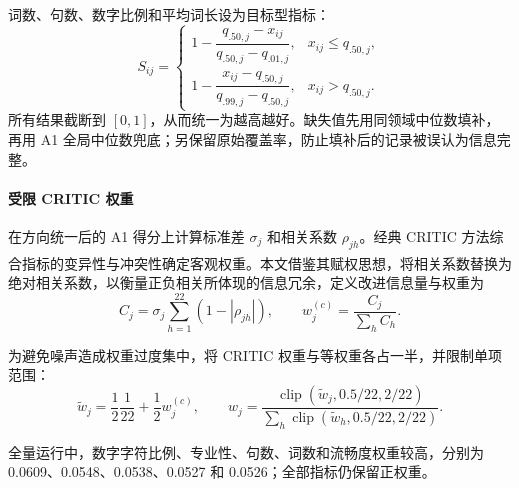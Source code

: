 \documentclass[bwprint]{gmcmthesis}
\numberwithin{equation}{section}
\numberwithin{figure}{section}
\numberwithin{table}{section}
\begin{document}
        词数、句数、数字比例和平均词长设为目标型指标：
        \begin{equation}
        S_{ij}=\begin{cases}
        1-\dfrac{q_{.50,j}-x_{ij}}{q_{.50,j}-q_{.01,j}},&x_{ij}\le q_{.50,j},\\[6pt]
        1-\dfrac{x_{ij}-q_{.50,j}}{q_{.99,j}-q_{.50,j}},&x_{ij}>q_{.50,j}.
        \end{cases}
        \label{eq:target}
        \end{equation}
        所有结果截断到 $[0,1]$，从而统一为越高越好。缺失值先用同领域中位数填补，再用 A1 全局中位数兜底；另保留原始覆盖率，防止填补后的记录被误认为信息完整。
        
        
        \paragraph{受限 CRITIC 权重}
        在方向统一后的 A1 得分上计算标准差 $\sigma_j$ 和相关系数 $\rho_{jh}$。经典 CRITIC 方法综合指标的变异性与冲突性确定客观权重\textsuperscript{\cite{diakoulaki1995critic}}。本文借鉴其赋权思想，将相关系数替换为绝对相关系数，以衡量正负相关所体现的信息冗余，定义改进信息量与权重为
        \begin{equation}
        C_j=\sigma_j\sum_{h=1}^{22}(1-|\rho_{jh}|),\qquad
        w_j^{(c)}=\frac{C_j}{\sum_hC_h}.
        \label{eq:critic}
        \end{equation}
        
        为避免噪声造成权重过度集中，将 CRITIC 权重与等权重各占一半，并限制单项范围：
        \begin{equation}
        \widetilde w_j=\frac12\frac1{22}+\frac12w_j^{(c)},\qquad
        w_j=\frac{\operatorname{clip}(\widetilde w_j,0.5/22,2/22)}
        {\sum_h\operatorname{clip}(\widetilde w_h,0.5/22,2/22)}.
        \label{eq:weight}
        \end{equation}
        
        全量运行中，数字字符比例、专业性、句数、词数和流畅度权重较高，分别为 0.0609、0.0548、0.0538、0.0527 和 0.0526；全部指标仍保留正权重。

        
\end{document}

